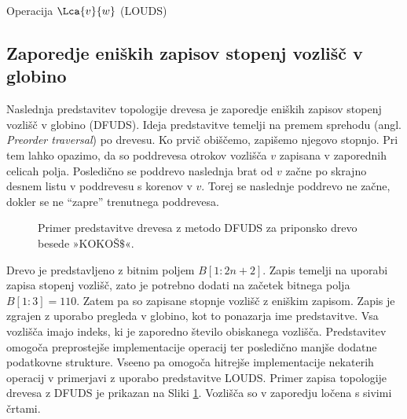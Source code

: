\begin{algorithm}[hbt]

\caption{Operacija $\Lca{v}{w}$ (LOUDS)}\label{alg:LOUDSlca}
{
    
}
\end{algorithm}


\subsection{Zaporedje eniških zapisov stopenj vozlišč v globino}\label{sec:DFUDS}

Naslednja predstavitev topologije drevesa je zaporedje eniških zapisov stopenj vozlišč v globino (DFUDS). Ideja predstavitve temelji na premem sprehodu (angl. \textit{Preorder traversal}) po drevesu.  Ko prvič obiščemo, zapišemo njegovo stopnjo. Pri tem lahko opazimo, da so poddrevesa otrokov vozlišča $v$ zapisana v zaporednih celicah polja. Posledično se poddrevo naslednja brat od $v$ začne po skrajno desnem listu v poddrevesu s korenov v $v$. Torej se naslednje poddrevo ne začne, dokler se ne \enquote{zapre} trenutnega poddrevesa. 
\begin{figure}[htb]
    \begin{center}
        
        \caption{Primer predstavitve drevesa z metodo DFUDS za priponsko drevo besede »KOKOŠ$\$$«.} 
        \label{fig:DFUDS}
    \end{center}
\end{figure}

Drevo je predstavljeno z bitnim poljem $B[1:2n+2]$. Zapis temelji na uporabi zapisa stopenj vozlišč, zato je potrebno dodati na začetek bitnega polja $B[1:3]=110$. Zatem pa so zapisane stopnje vozlišč z eniškim zapisom. Zapis je zgrajen z uporabo pregleda v globino, kot to ponazarja ime predstavitve. Vsa vozlišča imajo indeks, ki je zaporedno število obiskanega vozlišča. Predstavitev omogoča preprostejše implementacije operacij ter posledično manjše dodatne podatkovne strukture. Vseeno pa omogoča hitrejše implementacije nekaterih operacij v primerjavi z uporabo predstavitve LOUDS. Primer zapisa topologije drevesa z DFUDS je prikazan na Sliki \ref{fig:DFUDS}. Vozlišča so v zaporedju ločena s sivimi črtami.

